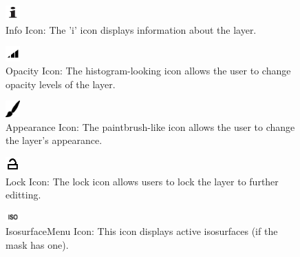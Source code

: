 \documentclass[fleqn,11pt,openany]{book}
\begin{document}
\begin{figure}
  \includegraphics[width=0.05\textwidth]{Seg3DBasicFunctionality_figures/InfoOff.png}%
  \caption{Info Icon: The 'i' icon displays information about the layer.}
\end{figure}

\begin{figure}
  \includegraphics[width=0.05\textwidth]{Seg3DBasicFunctionality_figures/OpacityOff.png}%
  \caption{Opacity Icon: The histogram-looking icon allows the user to change opacity levels of the layer.}
\end{figure}

\begin{figure}
\vspace{4 pt}
  \includegraphics[width=0.05\textwidth]{Seg3DBasicFunctionality_figures/AppearanceOff.png}%
  \caption{Appearance Icon: The paintbrush-like icon allows the user to change the layer's appearance.}
\end{figure}

\begin{figure}
  \includegraphics[width=0.05\textwidth]{Seg3DBasicFunctionality_figures/LockOff.png}%
  \caption{Lock Icon: The lock icon allows users to lock the layer to further editting.}
\end{figure}

\begin{figure}
\vspace{6 pt}
  \includegraphics[width=0.05\textwidth]{Seg3DBasicFunctionality_figures/IsosurfaceMenuOff.png}%
  \caption{IsosurfaceMenu Icon: This icon displays active isosurfaces (if the mask has one).}
\end{figure}
\end{document}
